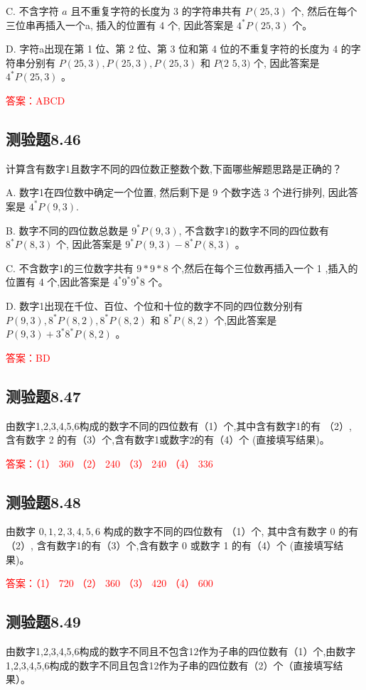\documentclass[UTF8, heading=true]{ctexart}
\begin{document}
C. 不含字符 $a$ 且不重复字符的长度为 3 的字符串共有 $P(25,3)$ 个, 然后在每个三位串再插入一个a, 插入的位置有 4 个, 因此答案是 $4^* P(25,3)$ 个。

D. 字符a出现在第 1 位、第 2 位、第 3 位和第 4 位的不重复字符的长度为 4 的字符串分别有 $P(25,3), P(25,3), P(25,3)$ 和 $P(2$ $5,3)$ 个, 因此答案是 $4^* P(25,3)$ 。


\textcolor{red}{答案：ABCD}

\subsection{测验题8.46}

计算含有数字1且数字不同的四位数正整数个数,下面哪些解题思路是正确的？

A. 数字1在四位数中确定一个位置, 然后剩下是 9 个数字选 3 个进行排列, 因此答案是 $4 ^* P(9,3)$.

B. 数字不同的四位数总数是 $9^* P(9,3)$, 不含数字1的数字不同的四位数有 $8^* P(8,3)$ 个, 因此答案是 $9 ^* P(9,3)-8^* P(8,3)$ 。

C. 不含数字1的三位数字共有 $9 * 9 * 8$ 个,然后在每个三位数再插入一个 1 ,插入的位置有 4 个,因此答案是 $4 ^* 9 ^* 9 ^* 8$ 个。

D. 数字1出现在千位、百位、个位和十位的数字不同的四位数分别有 $P(9,3), 8 ^* P(8,2), 8^* P(8,2)$ 和 $8 ^* P(8,2)$ 个,因此答案是 $P(9,3) + 3^* 8^* P(8,2)$ 。

\textcolor{red}{答案：BD}

\subsection{测验题8.47}

由数字1,2,3,4,5,6构成的数字不同的四位数有（1）个,其中含有数字1的有
（2）, 含有数字 2 的有（3）个,含有数字1或数字2的有（4）个 (直接填写结果)。

\textcolor{red}{答案：（1） 360 （2） 240 （3） 240 （4） 336}

\subsection{测验题8.48}

由数字 $0,1,2,3,4,5,6$ 构成的数字不同的四位数有 （1）个, 其中含有数字 0 的有
（2）, 含有数字1的有（3）个,含有数字 0 或数字 1 的有（4）个 (直接填写结果)。

\textcolor{red}{答案：（1） 720 （2） 360 （3） 420 （4） 600}

\subsection{测验题8.49}
由数字1,2,3,4,5,6构成的数字不同且不包含12作为子串的四位数有（1）个,由数字1,2,3,4,5,6构成的数字不同且包含12作为子串的四位数有（2）个（直接填写结果）。
\end{document}
